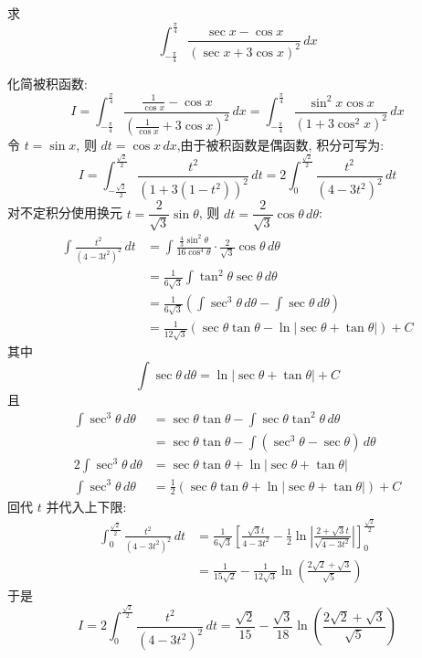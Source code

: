 \begin{questions}
    \question 求
    \[ 
    \int_{-\frac{\pi}{4}}^{\frac{\pi}{4}} \frac{\sec x - \cos x}{(\sec x + 3\cos x)^2} \,dx 
    \]
    \begin{solution}
        化简被积函数:
        \[ 
        I=\int_{-\frac{\pi}{4}}^{\frac{\pi}{4}} \frac{\frac{1}{\cos x} - \cos x}{(\frac{1}{\cos x} + 3\cos x)^2} \,dx = \int_{-\frac{\pi}{4}}^{\frac{\pi}{4}} \frac{\sin^2 x \cos x}{(1+3\cos^2 x)^2} \,dx 
        \]
        令 $t = \sin x$, 则 $dt = \cos x \,dx$,由于被积函数是偶函数, 积分可写为:
        \[ 
        I=\int_{-\frac{\sqrt{2}}{2}}^{\frac{\sqrt{2}}{2}} \frac{t^2}{(1+3(1-t^2))^2} \,dt = 2 \int_{0}^{\frac{\sqrt{2}}{2}} \frac{t^2}{(4-3t^2)^2} \,dt 
        \]
        对不定积分使用换元 $t = \dfrac{2}{\sqrt{3}}\sin\theta$, 则 $dt = \dfrac{2}{\sqrt{3}}\cos\theta \,d\theta$:
        \begin{align*}
        \int \frac{t^2}{(4-3t^2)^2} \,dt 
        &= \int \frac{\frac{4}{3}\sin^2\theta}{16\cos^4\theta} \cdot \frac{2}{\sqrt{3}}\cos\theta \,d\theta \\
        &= \frac{1}{6\sqrt{3}} \int \tan^2\theta \sec\theta \,d\theta \\
        &= \frac{1}{6\sqrt{3}} \left( \int \sec^3\theta \,d\theta - \int \sec\theta \,d\theta \right) \\
        &= \frac{1}{12\sqrt{3}} (\sec\theta \tan\theta - \ln |\sec\theta + \tan\theta|) + C 
        \end{align*}
        其中
        \[
        \int \sec \theta \,d\theta = \ln |\sec \theta + \tan \theta| + C
        \]
        且
        \begin{align*}
        \int \sec^3 \theta \,d\theta &= \sec \theta \tan \theta - \int \sec \theta \tan^2 \theta \,d\theta \\
        &= \sec \theta \tan \theta - \int (\sec^3 \theta - \sec \theta) \,d\theta \\
        2 \int \sec^3 \theta \,d\theta &= \sec \theta \tan \theta + \ln |\sec \theta + \tan \theta| \\
        \int \sec^3 \theta \,d\theta &= \frac{1}{2} (\sec \theta \tan \theta + \ln |\sec \theta + \tan \theta|) + C
        \end{align*}
        回代 $t$ 并代入上下限:
        \begin{align*}
        \int_{0}^{\frac{\sqrt{2}}{2}} \frac{t^2}{(4-3t^2)^2} \,dt 
        &= \frac{1}{6\sqrt{3}} \left[ \frac{\sqrt{3}t}{4-3t^2} - \frac{1}{2} \ln \left| \frac{2+\sqrt{3}t}{\sqrt{4-3t^2}} \right| \right]_{0}^{\frac{\sqrt{2}}{2}} \\
        &= \frac{1}{15\sqrt{2}} - \frac{1}{12\sqrt{3}} \ln \left( \frac{2\sqrt{2}+\sqrt{3}}{\sqrt{5}} \right) 
        \end{align*}
        于是
        \[ 
        I=2 \int_{0}^{\frac{\sqrt{2}}{2}} \frac{t^2}{(4-3t^2)^2} \,dt = \frac{\sqrt{2}}{15} - \frac{\sqrt{3}}{18} \ln \left( \frac{2\sqrt{2}+\sqrt{3}}{\sqrt{5}} \right) 
        \]
    \end{solution}
    

\end{questions}

